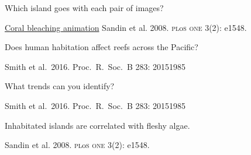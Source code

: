 \documentclass[t]{beamer}
\begin{document}
{
\begin{frame}[b]{Which island goes with each pair of images?}


	\tiny {}\href{http://coralreefwatch.noaa.gov/satellite/baa.php}{Coral bleaching animation} \hfill \onslide<1->\tiny Sandin et al. 2008. \textsc{pl}o\textsc{s one} 3(2): e1548.

\end{frame}
}
%
%
{
\begin{frame}[b]{Does human habitation affect reefs across the Pacific?}

	\hfill \tiny Smith et al.~2016. Proc.~R.~Soc.~B 283: 20151985

\end{frame}
}
%
{
\begin{frame}[b]

	\hfill {}

\end{frame}
}
%
{
\begin{frame}[b]{What trends can you identify?}

	\hfill \tiny Smith et al.~2016. Proc.~R.~Soc.~B 283: 20151985

\end{frame}
}
%
{
\begin{frame}[b]{Inhabitated islands are correlated with fleshy algae.}

	\hfill \tiny {}

\end{frame}
}
%
{
\begin{frame}[b]

	\hfill \tiny Sandin et al. 2008. \textsc{pl}o\textsc{s one} 3(2): e1548.

\end{frame}
}
\end{document}

